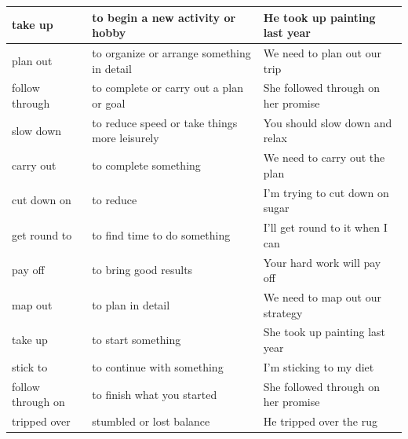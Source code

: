 \begin{longtable}{p{}p{}p{}}
\hline
take up & to begin a new activity or hobby & He took up painting last year \\
\hline
plan out & to organize or arrange something in detail & We need to plan out our trip \\
\hline
follow through & to complete or carry out a plan or goal & She followed through on her promise \\
\hline
slow down & to reduce speed or take things more leisurely & You should slow down and relax \\
\hline
carry out & to complete something & We need to carry out the plan \\
\hline
cut down on & to reduce & I'm trying to cut down on sugar \\
\hline
get round to & to find time to do something & I'll get round to it when I can \\
\hline
pay off & to bring good results & Your hard work will pay off \\
\hline
map out & to plan in detail & We need to map out our strategy \\
\hline
take up & to start something & She took up painting last year \\
\hline
stick to & to continue with something & I'm sticking to my diet \\
\hline
follow through on & to finish what you started & She followed through on her promise \\
\hline 
tripped over & stumbled or lost balance & He tripped over the rug \\
\hline
\end{longtable}




